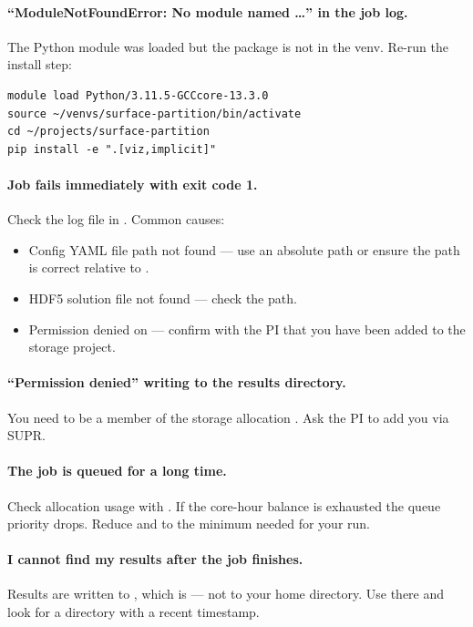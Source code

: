 \documentclass[11pt,a4paper]{article}
\begin{document}
\paragraph{``ModuleNotFoundError: No module named \ldots'' in the job log.}
The Python module was loaded but the package is not in the venv.
Re-run the install step:
\begin{lstlisting}[style=shell]
module load Python/3.11.5-GCCcore-13.3.0
source ~/venvs/surface-partition/bin/activate
cd ~/projects/surface-partition
pip install -e ".[viz,implicit]"
\end{lstlisting}

\paragraph{Job fails immediately with exit code 1.}
Check the  log file in .  Common causes:
\begin{itemize}[leftmargin=1.5em]
  \item Config YAML file path not found --- use an absolute path or ensure
        the path is correct relative to .
  \item HDF5 solution file not found --- check the  path.
  \item Permission denied on  --- confirm with
        the PI that you have been added to the storage project.
\end{itemize}

\paragraph{``Permission denied'' writing to the results directory.}
You need to be a member of the storage allocation
.  Ask the PI to add you via SUPR.

\paragraph{The job is queued for a long time.}
Check allocation usage with .  If the core-hour balance is
exhausted the queue priority drops.  Reduce  and 
to the minimum needed for your run.

\paragraph{I cannot find my results after the job finishes.}
Results are written to , which is
 ---
not to your home directory.  Use  there and look for a
 directory with a recent timestamp.
\end{document}
